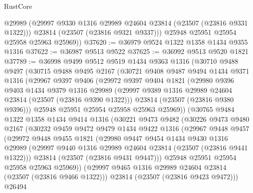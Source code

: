 \begin{lexlean}{RustCore}
\begin{coremodule}
          @29989
          (@29997 @9330 @1316 @29989 @24604 @23814 (@23507 (@23816 @9331 @1322)))
          @23814
          (@23507 (@23816 @9321 @9337)))
        @25948
        @25951
        @25954
        @25958
        @25963
        @25969))
@37620 := @36979 @9524 @1322 @1358 @1434 @9355 @1316
@37622 := @36987 @9513 @9522
@37625 := @36992 @9513 @9520 @1821
@37789 := @36998
    @9499
    @9512
    @9519
    @1434
    @9363
    @1316
    (@30710
      @9488
      @9497
      (@30715
        @9488
        @9495
        @2167
        (@30721
          @9408
          @9487
          @9494
          @1434
          @9371
          @1316
          (@29967
            @9397
            @9406
            (@29972
              @9397
              @9404
              @1821
              (@29980
                @9396
                @9403
                @1434
                @9379
                @1316
                @29989
                (@29997 @9389 @1316 @29989 @24604 @23814 (@23507 (@23816 @9390 @1322)))
                @23814
                (@23507 (@23816 @9380 @9396)))
              @25948
              @25951
              @25954
              @25958
              @25963
              @25969))
          (@30765
            @9484
            @1322
            @1358
            @1434
            @9414
            @1316
            (@30221
              @9473
              @9482
              (@30226
                @9473
                @9480
                @2167
                (@30232
                  @9459
                  @9472
                  @9479
                  @1434
                  @9422
                  @1316
                  (@29967
                    @9448
                    @9457
                    (@29972
                      @9448
                      @9455
                      @1821
                      (@29980
                        @9447
                        @9454
                        @1434
                        @9430
                        @1316
                        @29989
                        (@29997 @9440 @1316 @29989 @24604 @23814 (@23507 (@23816 @9441 @1322)))
                        @23814
                        (@23507 (@23816 @9431 @9447)))
                      @25948
                      @25951
                      @25954
                      @25958
                      @25963
                      @25969))
                  (@29997 @9465 @1316 @29989 @24604 @23814 (@23507 (@23816 @9466 @1322)))
                  @23814
                  (@23507 (@23816 @9423 @9472)))
                @26494

\end{coremodule}
\end{lexlean}
